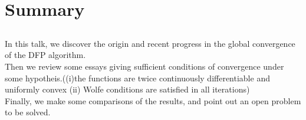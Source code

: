 \documentclass{beamer}
\begin{document}
\section{Summary}
\subsection{}

\begin{frame}
In this talk, we discover the origin and recent progress in the global convergence of the DFP algorithm.\\
Then we review some essays giving sufficient conditions of convergence under some hypotheis.((i)the functions are twice continuously differentiable and uniformly convex (ii) Wolfe conditions are satisfied in all iterations)\\
Finally, we make some comparisons of the results, and point out an open problem to be solved.

\end{frame}
\end{document}
